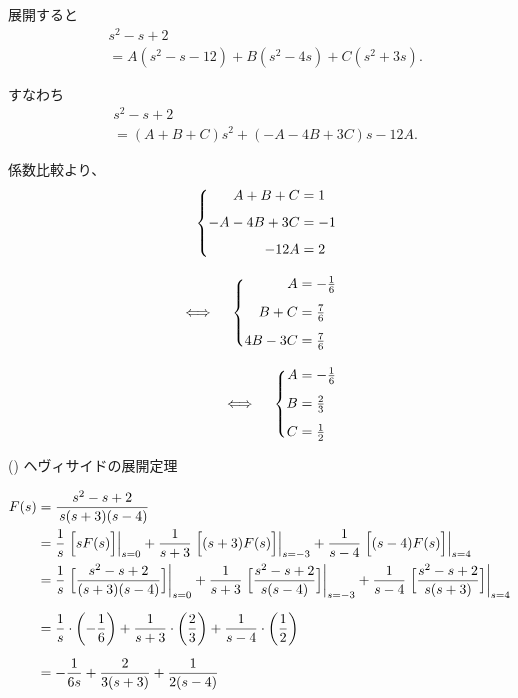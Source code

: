 \documentclass[a4paper,12pt]{report}
\begin{document}
  展開すると
  \begin{align*}
  &s^2-s+2 \\
  &= A(s^2-s-12) + B(s^2-4s) + C(s^2+3s).
  \end{align*}
  
  すなわち
  \begin{align*}
  &s^2-s+2 \\
  &= (A+B+C)s^2 + (-A-4B+3C)s -12A.
  \end{align*}
  
  係数比較より、
  \begin{align}
    \left\{
      \begin{aligned}
        A + B + C &= 1 \\[1ex]
        -A - 4B + 3C &= -1 \\[1ex]
        -12A &= 2
      \end{aligned}
    \right. \notag \\[2ex]
    \iff\quad
    \left\{
      \begin{aligned}
        A &= -\tfrac{1}{6} \\[1ex]
        B + C &= \tfrac{7}{6} \\[1ex]
        4B - 3C &= \tfrac{7}{6}
      \end{aligned}
    \right. \notag \\[2ex]
    \iff\quad
    \left\{
      \begin{aligned}
        A &= -\tfrac{1}{6} \\[1ex]
        B &= \tfrac{2}{3} \\[1ex]
        C &= \tfrac{1}{2}
      \end{aligned}
    \right. \notag
    \end{align}
    

  \quad () ヘヴィサイドの展開定理
  
  \begin{align*}
F(s) &= \frac{s^2-s+2}{\,s(s+3)(s-4)} \\
      &= \frac{1}{s}\left.\Bigl[sF(s)\Bigr]\right|_{s=0} 
          + \frac{1}{s+3}\left.\Bigl[(s+3)F(s)\Bigr]\right|_{s=-3}
          + \frac{1}{s-4}\left.\Bigl[(s-4)F(s)\Bigr]\right|_{s=4} \\
      &= \frac{1}{s}\left.\Bigl[\frac{s^2-s+2}{(s+3)(s-4)}\Bigr]\right|_{s=0} 
          + \frac{1}{s+3}\left.\Bigl[\frac{s^2-s+2}{s(s-4)}\Bigr]\right|_{s=-3}
          + \frac{1}{s-4}\left.\Bigl[\frac{s^2-s+2}{s(s+3)}\Bigr]\right|_{s=4} \\[2mm]
      &= \frac{1}{s}\cdot\left(-\frac{1}{6}\right)
          + \frac{1}{s+3}\cdot\left(\frac{2}{3}\right)
          + \frac{1}{s-4}\cdot\left(\frac{1}{2}\right) \\[2mm]
      &= -\frac{1}{6s} + \frac{2}{3(s+3)} + \frac{1}{2(s-4)}\,
\end{align*}
\end{document}
